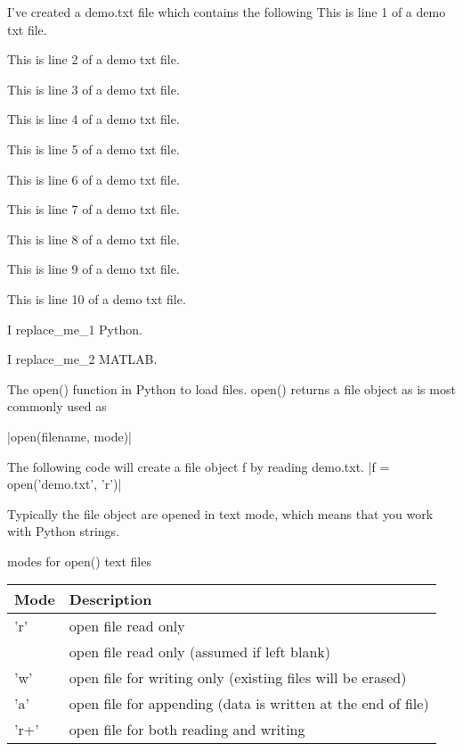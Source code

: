 \documentclass[10pt]{beamer}
\begin{document}
\begin{frame}{I've created a demo.txt file which contains the following}
This is line 1 of a demo txt file. 

This is line 2 of a demo txt file. 

This is line 3 of a demo txt file. 

This is line 4 of a demo txt file.

This is line 5 of a demo txt file.

This is line 6 of a demo txt file.

This is line 7 of a demo txt file.

This is line 8 of a demo txt file.

This is line 9 of a demo txt file.

This is line 10 of a demo txt file.

I replace\_me\_1 Python.

I replace\_me\_2 MATLAB.
\end{frame}

\begin{frame}[fragile]{The open() function in Python to load files.}
open() returns a file object as is most commonly used as 

|open(filename, mode)|

The following code will create a file object f by reading demo.txt.
|f = open('demo.txt', 'r')|

Typically the file object are opened in text mode, which means that you work with Python strings. 
\end{frame}

\begin{frame}{modes for open() text files}
\begin{table}
\begin{tabular}{ll}
\textbf{Mode} & \textbf{Description}  \\
\hline
'r' &	open file read only \\
 &	open file read only (assumed if left blank) \\
'w' & 	open file for writing only (existing files will be erased) \\
'a' &   open file for appending (data is written at the end of file) \\
'r+'&   open file for both reading and writing
\end{tabular}
\end{table}
\end{frame}
\end{document}
